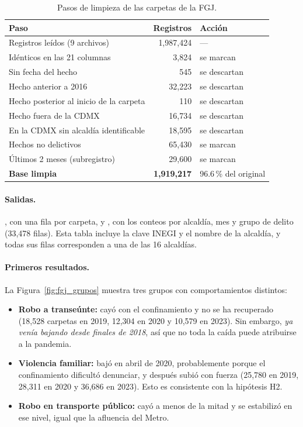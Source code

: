 \begin{table}[h]
\centering
\caption{Pasos de limpieza de las carpetas de la FGJ.}\label{tab:limpieza_fgj}
\small
\begin{tabular}{lrl}
\toprule
\textbf{Paso} & \textbf{Registros} & \textbf{Acción}\\
\midrule
Registros leídos (9 archivos) & 1,987,424 & ---\\
Idénticos en las 21 columnas & 3,824 & se marcan\\
Sin fecha del hecho & 545 & se descartan\\
Hecho anterior a 2016 & 32,223 & se descartan\\
Hecho posterior al inicio de la carpeta & 110 & se descartan\\
Hecho fuera de la CDMX & 16,734 & se descartan\\
En la CDMX sin alcaldía identificable & 18,595 & se descartan\\
Hechos no delictivos & 65,430 & se marcan\\
Últimos 2 meses (subregistro) & 29,600 & se marcan\\
\midrule
\textbf{Base limpia} & \textbf{1,919,217} & 96.6\,\% del original\\
\bottomrule
\end{tabular}
\end{table}

\paragraph{Salidas.} , con una fila por carpeta, y
, con los conteos por alcaldía, mes y grupo de delito
(33,478 filas). Esta tabla incluye la clave INEGI y el nombre de la alcaldía, y todas sus filas
corresponden a una de las 16 alcaldías.

\paragraph{Primeros resultados.} La Figura~\ref{fig:fgj_grupos} muestra tres grupos con
comportamientos distintos:
\begin{itemize}
  \item \textbf{Robo a transeúnte:} cayó con el confinamiento y no se ha recuperado (18,528
        carpetas en 2019, 12,304 en 2020 y 10,579 en 2023). Sin embargo, \emph{ya venía bajando
        desde finales de 2018}, así que no toda la caída puede atribuirse a la pandemia.
  \item \textbf{Violencia familiar:} bajó en abril de 2020, probablemente porque el confinamiento
        dificultó denunciar, y después subió con fuerza (25,780 en 2019, 28,311 en 2020 y 36,686
        en 2023). Esto es consistente con la hipótesis H2.
  \item \textbf{Robo en transporte público:} cayó a menos de la mitad y se estabilizó en ese nivel,
        igual que la afluencia del Metro.
\end{itemize}

